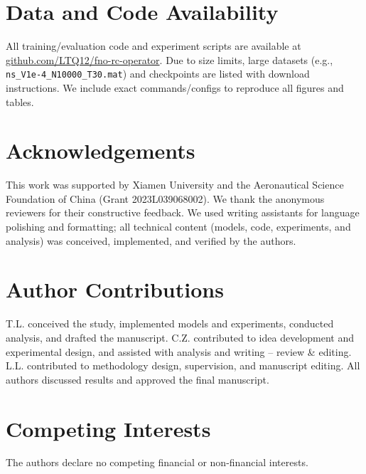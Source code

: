 \documentclass[11pt]{article}
\begin{document}
\section*{Data and Code Availability}
All training/evaluation code and experiment scripts are available at \href{https://github.com/LTQ12/fno-rc-operator}{github.com/LTQ12/fno-rc-operator}. Due to size limits, large datasets (e.g., \texttt{ns\_V1e-4\_N10000\_T30.mat}) and checkpoints are listed with download instructions. We include exact commands/configs to reproduce all figures and tables.

\section*{Acknowledgements}
This work was supported by Xiamen University and the Aeronautical Science Foundation of China (Grant 2023L039068002). We thank the anonymous reviewers for their constructive feedback. We used writing assistants for language polishing and formatting; all technical content (models, code, experiments, and analysis) was conceived, implemented, and verified by the authors.

\section*{Author Contributions}
T.L. conceived the study, implemented models and experiments, conducted analysis, and drafted the manuscript. C.Z. contributed to idea development and experimental design, and assisted with analysis and writing – review & editing. L.L. contributed to methodology design, supervision, and manuscript editing. All authors discussed results and approved the final manuscript.

\section*{Competing Interests}
The authors declare no competing financial or non-financial interests.




\clearpage
\end{document}
